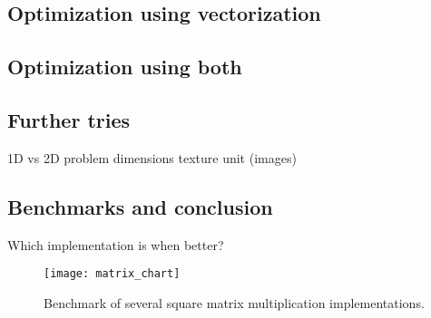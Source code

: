 \subsection{Optimization using vectorization}





\subsection{Optimization using both}



\subsection{Further tries}
1D vs 2D problem dimensions
texture unit (images)


\subsection{Benchmarks and conclusion}
Which implementation is when better?


\begin{figure}
	\centering
	\texttt{[image: matrix\_chart]}
	\caption{Benchmark of several square matrix multiplication implementations.}
	\label{fig:matrix_chart}
\end{figure}


